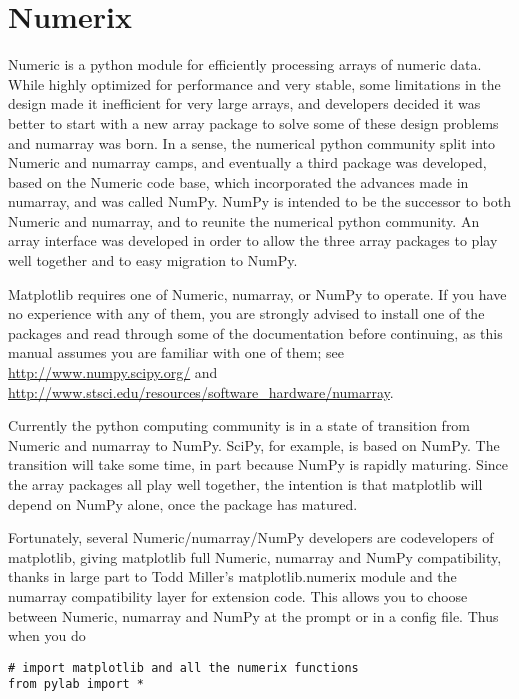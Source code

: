 \documentclass[twoside]{book}
\begin{document}
\section{Numerix}
\label{sec:numerix}

Numeric is a python module for efficiently processing arrays of
numeric data.  While highly optimized for performance and very stable,
some limitations in the design made it inefficient for very large
arrays, and developers decided it was better to start with a new array
package to solve some of these design problems and numarray was born. 
In a sense, the numerical python community split into Numeric and 
numarray camps, and eventually a third package was developed, based 
on the Numeric code base, which incorporated the advances made in 
numarray, and was called NumPy. NumPy is intended to be the successor 
to both Numeric and numarray, and to reunite the numerical python 
community. An array interface was developed in order to allow the three 
array packages to play well together and to easy migration to NumPy.

Matplotlib requires one of Numeric, numarray, or NumPy to operate.  If you
have no experience with any of them, you are strongly advised to install
one of the packages and read through some of the documentation before
continuing, as this manual assumes you are familiar with one of them;
see \url{http://www.numpy.scipy.org/} and
\url{http://www.stsci.edu/resources/software_hardware/numarray}.

Currently the python computing community is in a state of transition
from Numeric and numarray to NumPy. SciPy, for example, is based on NumPy.
The transition will take some time, in part because NumPy is rapidly maturing.
Since the array packages all play well together, the intention is that matplotlib
will depend on NumPy alone, once the package has matured.

Fortunately, several Numeric/numarray/NumPy developers are codevelopers of
matplotlib, giving matplotlib full Numeric, numarray and NumPy compatibility,
thanks in large part to Todd Miller's matplotlib.numerix module and
the numarray compatibility layer for extension code.  This allows you
to choose between Numeric, numarray and NumPy at the prompt or in a config
file.  Thus when you do

\begin{lstlisting}
# import matplotlib and all the numerix functions
from pylab import *
\end{lstlisting}
\end{document}
